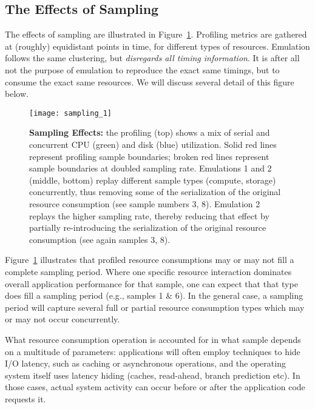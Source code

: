 \documentclass[10pt, conference, compsocconf]{IEEEtran}
\newcommand{\I}[1]{\textit{#1}\xspace}
\begin{document}
 \subsection{The Effects of Sampling}
 \label{sec:sampling}

  The effects of sampling are illustrated in
  Figure~\ref{fig:sampling_1}.  Profiling metrics are gathered at
  (roughly) equidistant points in time, for different types of
  resources.  Emulation follows the same clustering, but \I{disregards
  all timing information}.  It is after all not the purpose of
  emulation to reproduce the exact same timings, but to consume the
  exact same resources.  We will discuss several detail of this figure
  below.

  \begin{figure}[b]
   \centering
   \texttt{[image: sampling\_1]}
   \caption{\textbf{Sampling Effects:} the profiling (top) shows
     a mix of serial and concurrent CPU (green) and disk (blue)
     utilization.  Solid red lines represent profiling sample
     boundaries; broken red lines represent sample boundaries at
     doubled sampling rate.  Emulations 1 and 2 (middle, bottom)
     replay different sample types (compute, storage) concurrently,
     thus removing some of the serialization of the original resource
     consumption (see sample numbers 3, 8).  Emulation 2 replays the
     higher sampling rate, thereby reducing that effect by partially
     re-introducing the serialization of the original resource
     consumption (see again samples 3, 8).
     \label{fig:sampling_1} 
     } 
  \end{figure}

  Figure~\ref{fig:sampling_1} illustrates that profiled resource
  consumptions may or may not fill a complete sampling period.  Where
  one specific resource interaction dominates overall application
  performance for that sample, one can expect that that type does fill
  a sampling period (e.g., samples 1 \& 6).  In the general case,
  a sampling period will capture several full or partial resource
  consumption types which may or may not occur concurrently.

  What resource consumption operation is accounted for in what sample
  depends on a multitude of parameters: applications will often employ
  techniques to hide I/O latency, such as caching or asynchronous
  operations, and the operating system itself uses latency hiding
  (caches, read-ahead, branch prediction etc).  In those cases, actual
  system activity can occur before or after the application code
  requests it.
  
\end{document}
